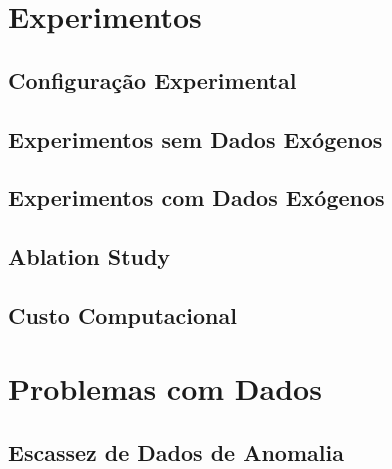 \documentclass[12pt,a4paper]{article}
\begin{document}
\section{Experimentos}

\subsection{Configuração Experimental}

\subsection{Experimentos sem Dados Exógenos}

\subsection{Experimentos com Dados Exógenos}

\subsection{Ablation Study}

\subsection{Custo Computacional}


\section{Problemas com Dados}

\subsection{Escassez de Dados de Anomalia}

\end{document}
